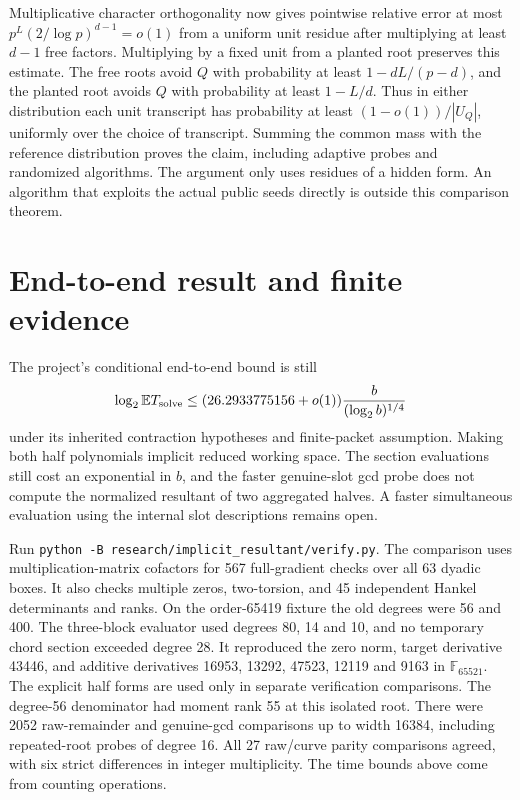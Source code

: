 \documentclass[11pt]{article}
\newcommand{\F}{\mathbb F}
\newcommand{\E}{\mathbb E}
\begin{document}
Multiplicative character orthogonality now gives pointwise relative
error at most $p^L(2/\log p)^{d-1}=o(1)$ from a uniform unit
residue after multiplying at least $d-1$ free factors. Multiplying
by a fixed unit from a planted root preserves this estimate.
The free roots avoid $Q$ with probability at least
$1-dL/(p-d)$, and the planted root avoids $Q$ with probability at
least $1-L/d$. Thus in either distribution each unit transcript
has probability at least $(1-o(1))/|U_Q|$, uniformly over the
choice of transcript. Summing the common mass with the reference
distribution proves the claim, including adaptive probes and
randomized algorithms. The argument only uses residues of a hidden
form. An algorithm that exploits the actual public seeds directly
is outside this comparison theorem.

\section{End-to-end result and finite evidence}
The project's conditional end-to-end bound is still
\[
  \log_2\E T_{\rm solve}\le (26.2933775156+o(1))
                 \frac{b}{(\log_2 b)^{1/4}}
\]
under its inherited contraction hypotheses and finite-packet
assumption. Making both half polynomials implicit reduced working
space. The section evaluations still cost an exponential in $b$,
and the faster genuine-slot gcd probe does not compute the
normalized resultant of two aggregated halves. A faster simultaneous
evaluation using the internal slot descriptions remains open.

Run \texttt{python -B research/implicit\_resultant/verify.py}.
The comparison uses multiplication-matrix cofactors for 567
full-gradient checks over all 63 dyadic boxes. It also checks
multiple zeros, two-torsion, and 45 independent Hankel determinants
and ranks. On the order-65419 fixture the old degrees were 56 and
400. The three-block evaluator used degrees 80, 14 and 10, and no
temporary chord section exceeded degree 28. It reproduced the zero
norm, target derivative 43446, and additive derivatives
16953, 13292, 47523, 12119 and 9163 in $\F_{65521}$. The explicit
half forms are used only in separate verification comparisons.
The degree-56 denominator had moment rank 55 at this isolated root.
There were 2052 raw-remainder and genuine-gcd comparisons up to
width 16384, including repeated-root probes of degree 16. All 27 raw/curve parity comparisons agreed, with six
strict differences in integer multiplicity. The time bounds above come from counting operations.
\end{document}
